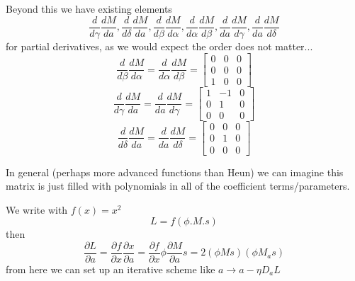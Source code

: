 \documentclass{article}
\begin{document}
Beyond this we have existing elements
$$
\frac{d}{d\gamma}\frac{dM}{da},\frac{d}{d\delta}\frac{dM}{da},\frac{d}{d\beta}\frac{dM}{d\alpha},\frac{d}{d\alpha}\frac{dM}{d\beta},\frac{d}{da}\frac{dM}{d\gamma},\frac{d}{da}\frac{dM}{d\delta}
$$
for partial derivatives, as we would expect the order does not matter...
$$
\frac{d}{d\beta}\frac{dM}{d\alpha} = \frac{d}{d\alpha}\frac{dM}{d\beta} = \begin{bmatrix}
0 & 0 & 0\\
0 & 0 & 0 \\
1 & 0 & 0
\end{bmatrix}
$$
$$
\frac{d}{d\gamma}\frac{dM}{da} = \frac{d}{da}\frac{dM}{d\gamma} = \begin{bmatrix}
1 & -1 & 0\\
0 & 1 & 0 \\
0 & 0 & 0
\end{bmatrix}
$$
$$
\frac{d}{d\delta}\frac{dM}{da} = \frac{d}{da}\frac{dM}{d\delta} = \begin{bmatrix}
0 & 0 & 0\\
0 & 1 & 0 \\
0 & 0 & 0
\end{bmatrix}
$$

In general (perhaps more advanced functions than Heun) we can imagine this matrix  is just filled with polynomials in all of the coefficient terms/parameters.

We write with $f(x) = x^2$
$$
L = f(\phi . M . s)
$$
then 
$$
\frac{\partial L}{\partial a} = \frac{\partial f}{\partial x}\frac{\partial x}{\partial a} = \frac{\partial f}{\partial x}\phi \frac{\partial M}{\partial a} s = 2 (\phi M s)(\phi M_a s)
$$
from here we can set up an iterative scheme like $a \to a - \eta D_a L$
\end{document}
